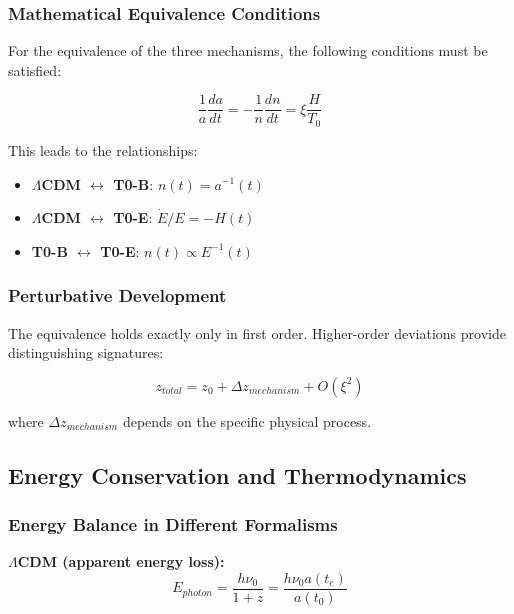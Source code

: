 \documentclass[12pt,a4paper]{article}
\theoremstyle{definition}
\begin{document}
	\subsubsection{Mathematical Equivalence Conditions}
	
	For the equivalence of the three mechanisms, the following conditions must be satisfied:
	
	\begin{equation}
		\boxed{\frac{1}{a}\frac{da}{dt} = -\frac{1}{n}\frac{dn}{dt} = \xi \frac{H}{T_0}}
	\end{equation}
	
	This leads to the relationships:
	\begin{itemize}
		\item \textbf{$\Lambda$CDM $\leftrightarrow$ T0-B}: $n(t) = a^{-1}(t)$
		\item \textbf{$\Lambda$CDM $\leftrightarrow$ T0-E}: $\dot{E}/E = -H(t)$
		\item \textbf{T0-B $\leftrightarrow$ T0-E}: $n(t) \propto E^{-1}(t)$
	\end{itemize}
	
	\subsubsection{Perturbative Development}
	
	The equivalence holds exactly only in first order. Higher-order deviations provide distinguishing signatures:
	
	\begin{equation}
		z_{total} = z_0 + \Delta z_{mechanism} + O(\xi^2)
	\end{equation}
	
	where $\Delta z_{mechanism}$ depends on the specific physical process.
	
	\subsection{Energy Conservation and Thermodynamics}
	\label{subsec:energy_conservation}
	
	\subsubsection{Energy Balance in Different Formalisms}
	
	\textbf{$\Lambda$CDM (apparent energy loss):}
	\begin{equation}
		E_{photon} = \frac{h\nu_0}{1+z} = \frac{h\nu_0 a(t_e)}{a(t_0)}
	\end{equation}
	
\end{document}
